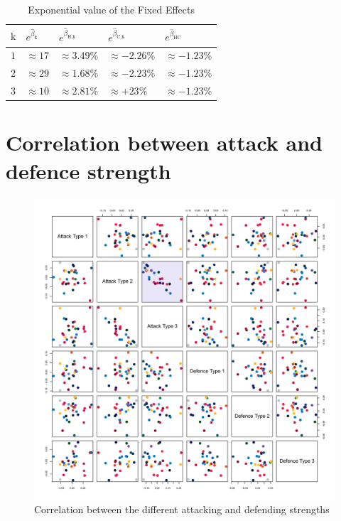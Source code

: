 \begin{table}[!ht]
\centering
\begin{tabular}{ |p{.5cm}|p{2cm}|p{2cm}|p{2cm}|p{2cm}|  }
    \hline
    $\text{k}$ & $e^{\hat\beta_\text{k}}$ & $e^{\hat\beta_{\text{H},\text{k}}}$ & $e^{\hat\beta_{\text{C},\text{k}}}$ & $e^{\hat\beta_\text{HC}}$ \\
    \hline
    $1$ & $\approx 17$ & $\approx 3.49\%$ & $\approx -2.26\%$ & $\approx -1.23\%$ \\
    $2$ & $\approx 29$ & $\approx 1.68\%$ & $\approx -2.23\%$ & $\approx -1.23\%$ \\
    $3$ & $\approx 10$ & $\approx 2.81\%$ & $\approx +23\%$ & $\approx -1.23\%$ \\
    \hline
\end{tabular}
\caption{Exponential value of the Fixed Effects}
\label{table:fixedEffExpCovid}
\end{table}

\section{Correlation between attack and defence strength} \label{corr_covid}

\begin{figure}[H]
    \centering
    \includegraphics[width=1\textwidth]{Figures/Corr.png}
    \caption[Correlation]{Correlation between the different attacking and defending strengths}
    \label{fig:Corr}
\end{figure}

